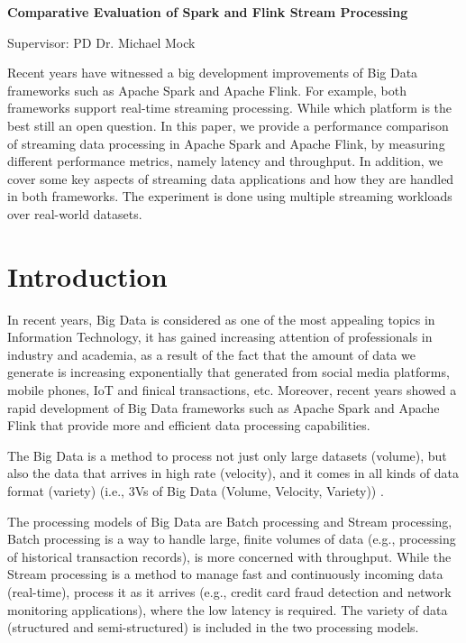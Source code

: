 \documentclass[]{article}
\begin{document}
\begin{flushleft}
\centering\LARGE {\bf Comparative Evaluation of Spark and Flink Stream Processing}

Supervisor: PD Dr. Michael Mock
\thispagestyle{empty}
\end{flushleft}
\newpage
\tableofcontents

\newpage


\begin{abstract}

\end{abstract}
Recent years have witnessed a big development improvements of Big Data frameworks such as Apache Spark and Apache Flink. For example, both frameworks support real-time
streaming processing. While which platform is the best still an open question. 
In this paper, we provide a performance comparison of streaming data processing in Apache Spark and Apache Flink, by measuring different performance metrics, namely latency and throughput. In addition, we cover some key aspects of streaming data applications and how they are handled in both frameworks. The experiment is done using multiple streaming workloads over real-world datasets.
\section{Introduction}

\par In recent years, Big Data is considered as one of the most appealing topics in Information Technology, it has gained increasing attention of professionals in industry and academia, as a result of the fact that the amount of data we generate is increasing exponentially \cite{idc} that generated from social media platforms, mobile phones, IoT and finical transactions, etc. Moreover, recent years showed a rapid development of Big Data frameworks such as Apache Spark and Apache Flink that provide more and efficient data processing capabilities.
 \par The Big Data is a method to process not just only large datasets (volume), but also the data that arrives in high rate (velocity), and it comes in all kinds of data format (variety) (i.e., 3Vs of Big Data (Volume, Velocity, Variety)) \cite{svs}.

\par The processing models of Big Data are Batch processing and Stream processing, Batch processing is a way to handle large, finite volumes of data (e.g., processing of historical transaction records), is more concerned with throughput. While the Stream processing  is a method to manage fast and continuously incoming data (real-time), process it as it arrives (e.g., credit card fraud detection and network monitoring applications), where the low latency is required. The variety of data (structured and semi-structured) is included in the two processing models.
\end{document}
